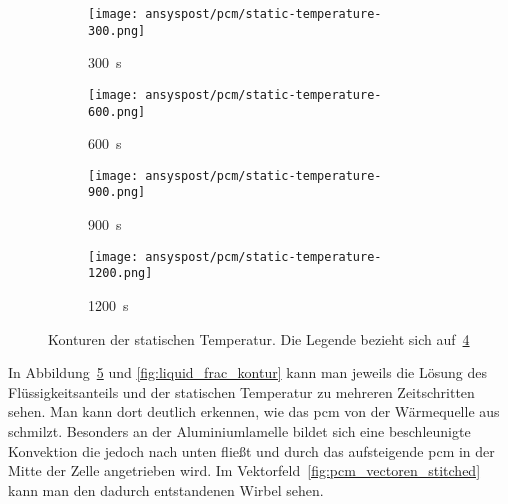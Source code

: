 \begin{figure}
\begin{minipage}[t]{0.485\textwidth}
        \label{fig:liquid_frac_kontur}
    \end{minipage}
    \hspace{2mm} %
    \begin{minipage}[t]{0.485\textwidth}
        \centering
        \begin{subfigure}[t]{0.16\textwidth}
            \centering
        \end{subfigure}%
        \hspace{2mm}%
        \begin{subfigure}[t]{0.2\textwidth}
            \centering
            \texttt{[image: ansyspost/pcm/static-temperature-300.png]}
            \caption{\SI{300}{\second}}\label{fig:temperatur_300}
        \end{subfigure}%
        \begin{subfigure}[t]{0.2\textwidth}
            \centering
            \texttt{[image: ansyspost/pcm/static-temperature-600.png]}
            \caption{\SI{600}{\second}}\label{fig:temperatur_600}
        \end{subfigure}%
        \begin{subfigure}[t]{0.2\textwidth}
            \centering
            \texttt{[image: ansyspost/pcm/static-temperature-900.png]}
            \caption{\SI{900}{\second}}\label{fig:temperatur_900}
        \end{subfigure}%
        \begin{subfigure}[t]{0.2\textwidth}
            \centering
            \texttt{[image: ansyspost/pcm/static-temperature-1200.png]}
            \caption{\SI{1200}{\second}}\label{fig:temperatur_1200}
        \end{subfigure}
        \caption{Konturen der statischen Temperatur. Die Legende bezieht sich auf~\ref{fig:temperatur_1200}}
        \label{fig:static_temperature_kontur}
    \end{minipage}

\end{figure}

In Abbildung~\ref{fig:static_temperature_kontur} und \ref{fig:liquid_frac_kontur} kann man jeweils die Lösung des Flüssigkeitsanteils
und der statischen Temperatur zu mehreren Zeitschritten sehen. Man kann dort deutlich erkennen, wie das \ac{pcm} von der Wärmequelle aus
schmilzt. Besonders an der Aluminiumlamelle bildet sich eine beschleunigte Konvektion die jedoch nach unten fließt und durch das aufsteigende
\ac{pcm} in der Mitte der Zelle angetrieben wird. Im Vektorfeld~\ref{fig:pcm_vectoren_stitched} kann man den dadurch entstandenen Wirbel sehen.

